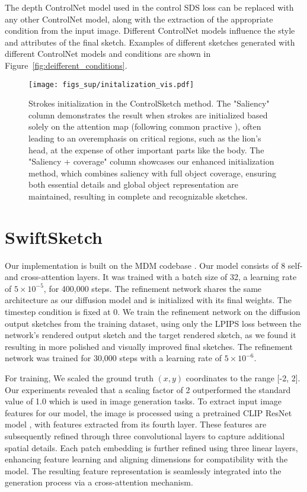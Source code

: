 {The depth ControlNet model used in the control SDS loss can be replaced with any other ControlNet model, along with the extraction of the appropriate condition from the input image. Different ControlNet models influence the style and attributes of the final sketch. Examples of different sketches generated with different ControlNet models and conditions are shown in Figure~\ref{fig:deifferent_conditions}.


 






\begin{figure}
    \centering
    \texttt{[image: figs\_sup/initalization\_vis.pdf]}
    \caption{ Strokes initialization in the ControlSketch method. The "Saliency" column demonstrates the result when strokes are initialized based solely on the attention map (following common practive \cite{vinker2022clipasso}), often leading to an overemphasis on critical regions, such as the lion's head, at the expense of other important parts like the body. The "Saliency + coverage" column showcases our enhanced initialization method, which combines saliency with full object coverage, ensuring both essential details and global object representation are maintained, resulting in complete and recognizable sketches.}
    \label{fig:initalization_vis}
\end{figure}

\section{SwiftSketch}
Our implementation is built on the MDM codebase \cite{tevet2023human}.
Our model consists of 8 self- and cross-attention layers. It was trained with a batch size of 32, a learning rate of $5 \times 10^{-5}$, for 400,000 steps. The refinement network shares the same architecture as our diffusion model and is initialized with its final weights. The timestep condition is fixed at 0. We train the refinement network on the diffusion output sketches from the training dataset, using only the LPIPS loss between the network’s rendered output sketch and the target rendered sketch, as we found it resulting in more polished and visually improved final sketches. The refinement network was trained for 30,000 steps with a learning rate of $5 \times 10^{-6}$.

For training, We scaled the ground truth $(x, y)$ coordinates to the range [-2, 2]. Our experiments revealed that a scaling factor of 2 outperformed the standard value of 1.0 which is used in image generation tasks.
To extract input image features for our model, the image is processed using a pretrained CLIP ResNet model \cite{Radfordclip}, with features extracted from its fourth layer. These features are subsequently refined through three convolutional layers to capture additional spatial details. Each patch embedding is further refined using three linear layers, enhancing feature learning and aligning dimensions for compatibility with the model. The resulting feature representation is seamlessly integrated into the generation process via a cross-attention mechanism.

}
